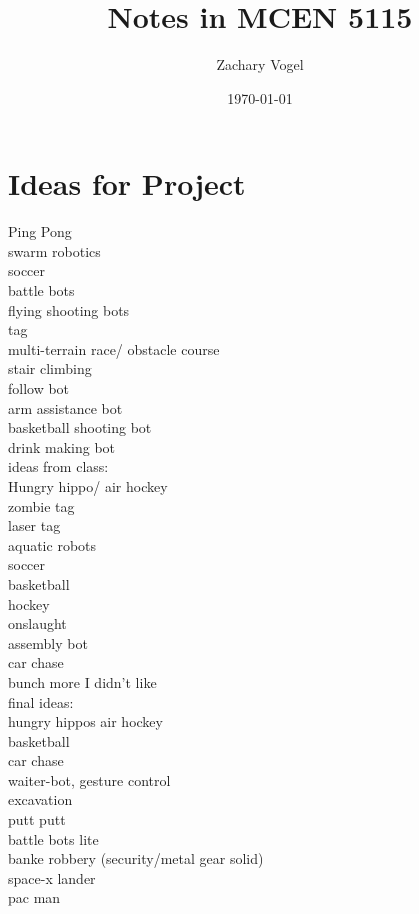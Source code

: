 \documentclass{article}
\author{Zachary Vogel}
\date{\today}
\title{Notes in MCEN 5115}
\begin{document}
\maketitle


\section*{Ideas for Project}
Ping Pong\\
swarm robotics\\
soccer\\
battle bots\\
flying shooting bots\\
tag\\
multi-terrain race/ obstacle course\\
stair climbing\\
follow bot\\
arm assistance bot\\
basketball shooting bot\\
drink making bot\\


ideas from class:\\
Hungry hippo/ air hockey\\
zombie tag\\
laser tag\\
aquatic robots\\
soccer\\
basketball\\
hockey\\
onslaught\\
assembly bot\\
car chase\\

bunch more I didn't like\\

final ideas:\\
hungry hippos air hockey\\
basketball\\
car chase\\
waiter-bot, gesture control\\
excavation\\
putt putt\\
battle bots lite\\
banke robbery (security/metal gear solid)\\
space-x lander\\
pac man\\
\end{document}
